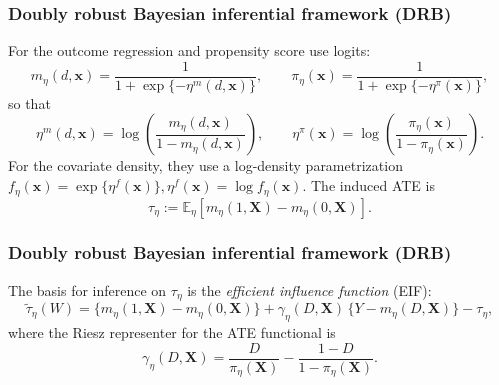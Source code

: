 \documentclass[12pt, compress]{beamer}
\begin{document}
\begin{frame}
	\frametitle{Doubly robust Bayesian inferential framework (DRB)}
For the outcome regression and propensity score use logits:
\[
m_\eta(d,\mathbf{x})=\frac{1}{1+\exp\{-\eta^m(d,\mathbf{x})\}},
\qquad
\pi_\eta(\mathbf{x})=\frac{1}{1+\exp\{-\eta^\pi(\mathbf{x})\}},
\]
so that
\[
\eta^m(d,\mathbf{x})=\log\!\left(\frac{m_\eta(d,\mathbf{x})}{1-m_\eta(d,\mathbf{x})}\right),
\qquad
\eta^\pi(\mathbf{x})=\log\!\left(\frac{\pi_\eta(\mathbf{x})}{1-\pi_\eta(\mathbf{x})}\right).
\]
For the covariate density, they use a log-density parametrization \(
f_\eta(\mathbf{x})=\exp\{\eta^f(\mathbf{x})\},
\eta^f(\mathbf{x})=\log f_\eta(\mathbf{x}).
\)
The induced ATE is
\[
\tau_\eta := \mathbb{E}_\eta\!\left[m_\eta(1,\mathbf{X})-m_\eta(0,\mathbf{X})\right].
\]

\end{frame}

\begin{frame}
	\frametitle{Doubly robust Bayesian inferential framework (DRB)}
The basis for inference on $\tau_\eta$ is the \textit{efficient influence function} (EIF):
\[
\tilde{\tau}_\eta(W)
= \big\{m_\eta(1,\mathbf{X})-m_\eta(0,\mathbf{X})\big\}
+ \gamma_\eta(D,\mathbf{X})\,\big\{Y-m_\eta(D,\mathbf{X})\big\}
- \tau_\eta,
\]
where the Riesz representer for the ATE functional is
\[
\gamma_\eta(D,\mathbf{X})
= \frac{D}{\pi_\eta(\mathbf{X})}
- \frac{1-D}{1-\pi_\eta(\mathbf{X})}.
\]
\end{frame}
\end{document}
